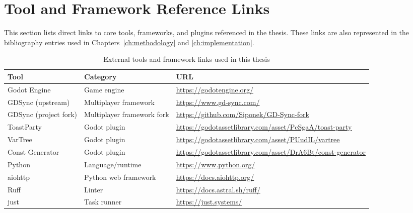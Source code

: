 \section{Tool and Framework Reference Links}
\label{app:d:tool-links}

This section lists direct links to core tools, frameworks, and plugins referenced in the thesis. These links are also represented in the bibliography entries used in Chapters~\ref{ch:methodology} and \ref{ch:implementation}.

\begin{table}[htbp]
    \centering
    \caption{External tools and framework links used in this thesis}
    \begin{tabular}{@{}p{3.2cm}p{2.8cm}p{7.0cm}@{}}
        \toprule
        \textbf{Tool}         & \textbf{Category}          & \textbf{URL}                                                     \\
        \midrule
        Godot Engine          & Game engine                & \url{https://godotengine.org/}                                   \\
        GDSync (upstream)     & Multiplayer framework      & \url{https://www.gd-sync.com/}                                   \\
        GDSync (project fork) & Multiplayer framework fork & \url{https://github.com/Siponek/GD-Sync-fork}                    \\
        ToastParty            & Godot plugin               & \url{https://godotassetlibrary.com/asset/PcSgaA/toast-party}     \\
        VarTree               & Godot plugin               & \url{https://godotassetlibrary.com/asset/PUudIL/vartree}         \\
        Const Generator       & Godot plugin               & \url{https://godotassetlibrary.com/asset/DrA6Bt/const-generator} \\
        Python                & Language/runtime           & \url{https://www.python.org/}                                    \\
        aiohttp               & Python web framework       & \url{https://docs.aiohttp.org/}                                  \\
        Ruff                  & Linter                     & \url{https://docs.astral.sh/ruff/}                               \\
        just                  & Task runner                & \url{https://just.systems/}                                      \\

\end{tabular}
\end{table}
